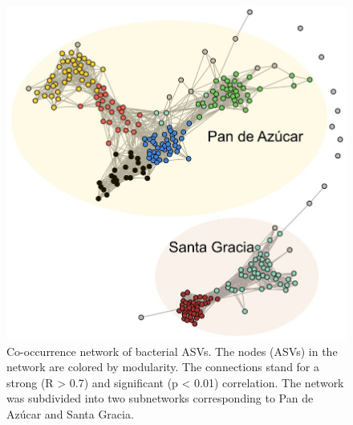 \begin{figure}[H]
	\centering
	\includegraphics[width=1\textwidth]{img/M3-Figure_7.jpg}
	\caption{Co-occurrence network of bacterial ASVs. The nodes (ASVs) in the network are colored by modularity. The connections stand for a strong (R > 0.7) and significant (p < 0.01) correlation. The network was subdivided into two subnetworks corresponding to Pan de Azúcar and Santa Gracia.}
	\label{fig:M3-F7}
\end{figure}

